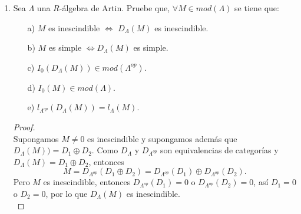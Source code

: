 \documentclass{article}
\begin{document}
\begin{enumerate}[label=\textbf{Ej \arabic*.}]
\begin{proof}
		En resumen, todo ideal $I$ de $R$ genera un ideal $Mat_{n \times n}\lrprth{R}$ y viceversa, todo ideal $J$ de $Mat_{n \times n}\lrprth{R}$ induce un ideal de $R$. Por tanto, hay una correspondencia biunívoca
		\begin{align*}
			\lrbrack{Ideales\ de\ R} &\longrightarrow \lrbrack{Ideales\ de\ Mat_{n \times n}\lrprth{R}}\\
			I &\mapsto Mat_{n \times n}\lrprth{I}
		\end{align*}
		
		Finalmente, sea $D$ un anillo con división. Entonces los únicos ideales de $D$ son $0$ y $D$. Por la correspondencia biyectiva entre ideales de $D$ e ideales de $Mat_{n \times n}\lrprth{D}$, se tiene que $Mat_{n \times n}\lrprth{D}$ no tiene ideales propios no triviales.\\
		$\therefore Mat_{n \times n}\lrprth{D}$ es un anillo simple.
	\end{proof}
	
	\item Sea $\Lambda$ una $R$-álgebra de Artin. Pruebe que, $\forall M\in mod(\Lambda)$ se tiene que: 
	\begin{itemize}
		\item[a)] $M$ es inescindible $\iff$ $D_\Lambda(M)$ es inescindible.
		\item[b)] $M$ es simple $\iff D_\Lambda(M)$ es simple.
		\item[c)] $I_0(D_\Lambda(M))\in mod(\Lambda^{op})$.
		\item[d)] $I_0(M)\in mod(\Lambda)$.
		\item[e)] $l_{\Lambda^{op}}(D_\Lambda(M))=l_\Lambda(M).$
	\end{itemize}
	\begin{proof}
		\\
		Supongamos $M\neq 0$ es inescindible y supongamos además que\\ $D_\Lambda(M))=D_1\oplus D_2$. Como $D_\Lambda$ y 
		$D_{\Lambda^{op}}$ son equivalencias de categorías y $D_\Lambda(M)=D_1\oplus D_2$, entonces 
		\[M=D_{\Lambda^{op}}(D_1\oplus D_2)=D_{\Lambda^{op}}(D_1)\oplus D_{\Lambda^{op}}(D_2).\]
		Pero $M$ es inescindible, entonces $D_{\Lambda^{op}}(D_1)=0$ o  $D_{\Lambda^{op}}(D_2)=0$, así $D_1=0$ o $D_2=0$, por lo que
		$D_\Lambda(M)$ es inescindible.\\
		

\end{proof}
\end{enumerate}
\end{document}
